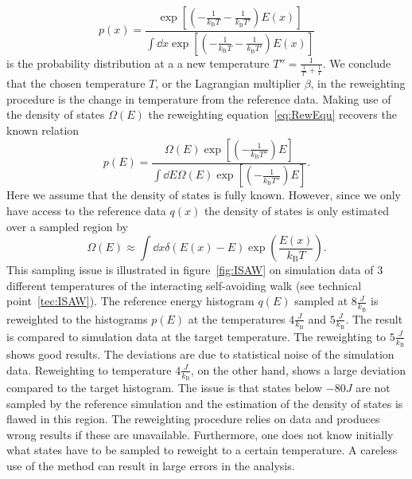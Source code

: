 \begin{equation}
     p(x) =  \frac{ \exp \left [ \left ( -\frac{1}{k_{\mathrm{B}} T} - \frac{1}{k_{\mathrm{B}} T'} \right )E(x) \right ]}
    {\int \dd{x} \exp \left [ \left ( -\frac{1}{k_{\mathrm{B}} T} - \frac{1}{k_{\mathrm{B}} T'} \right )E(x) \right ] }
\end{equation}
is the probability distribution at a a new temperature $T'' = \frac{1}{\frac{1}{T'}+\frac{1}{T}}$. We conclude that the chosen temperature $T$, or the Lagrangian multiplier $\beta$, in the reweighting procedure is the change in temperature from the reference data. Making use of the density of states $\Omega(E)$ the reweighting equation~\ref{eq:RewEqu} recovers the known relation 
\begin{equation}
     p(E) =  \frac{ \Omega(E) \exp \left [ \left ( -\frac{1}{k_{\mathrm{B}} T''} \right )E \right ]}
    {\int \dd{E} \Omega(E) \exp \left [ \left ( - \frac{1}{k_{\mathrm{B}} T''} \right )E \right ] }.
\end{equation}
Here we assume that the density of states is fully known. However, since we only have access to the reference data $q(x)$ the density of states is only estimated over a sampled region by
\begin{equation}
 \Omega(E) \approx \int \dd{x} \delta(E(x) - E) \exp \left ( \frac{E(x)}{k_{\mathrm{B}} T} \right ).
\end{equation}
This sampling issue is illustrated in figure~\ref{fig:ISAW} on simulation data of 3 different temperatures of the interacting self-avoiding walk (see technical point~\ref{tec:ISAW}). The reference energy histogram $q(E)$ sampled at $8 \frac{J}{k_{\mathrm{B}}}$ is reweighted to the histograms $p(E)$ at the temperatures  $4 \frac{J}{k_{\mathrm{B}}}$ and $5 \frac{J}{k_{\mathrm{B}}}$. The result is compared to simulation data at the target temperature. The reweighting to $5 \frac{J}{k_{\mathrm{B}}}$ shows good results. The deviations are due to statistical noise of the simulation data. Reweighting to temperature $4 \frac{J}{k_{\mathrm{B}}}$, on the other hand, shows a large deviation compared to the target histogram. The issue is that states below $-80 J$ are not sampled by the reference simulation and the estimation of the density of states is flawed in this region. The reweighting procedure relies on data and produces wrong results if these are unavailable. Furthermore, one does not know initially what states have to be sampled to reweight to a certain temperature.  A careless use of the method can result in large errors in the analysis.



